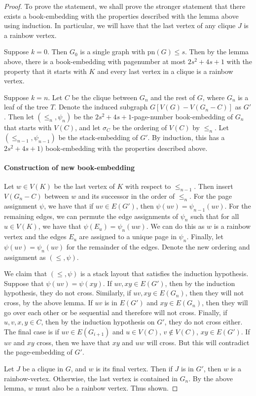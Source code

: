 \documentclass[]{report}
\newcommand{\pn}{\text{pn}}
\theoremstyle{definition}
\numberwithin{theorem}{section}
\numberwithin{equation}{section}
\begin{document}
\begin{proof}
	To prove the statement, we shall prove the stronger statement that there exists a book-embedding with the properties described with the lemma above using induction. In particular, we will have that the last vertex of any clique $J$ is a rainbow vertex.
	
	Suppose $k = 0$. Then $G_0$ is a single graph with $\pn(G) \leq s$. Then by the lemma above, there is a book-embedding with pagenumber at most $2s^2 + 4s + 1$ with the property that it starts with $K$ and every last vertex in a clique is a rainbow vertex.
	
	Suppose $k = n$. Let $C$ be the clique between $G_n$ and the rest of $G$, where $G_n$ is a leaf of the tree $T$. Denote the induced subgraph $G[V(G) - V(G_n - C)]$ as $G'$. Then let $(\leq_n, \psi_n)$ be the $2s^2 + 4s + 1$-page-number book-embedding of $G_n$ that starts with $V(C)$, and let $\sigma_C$ be the ordering of $V(C)$ by $\leq_n$. Let $(\leq_{n-1}, \psi_{n-1})$ be the stack-embedding of $G'$. By induction, this has a $2s^2 + 4s + 1)$ book-embedding with the properties described above.
	
	\paragraph{Construction  of new book-embedding}
	Let $w \in V(K)$ be the last vertex of $K$ with respect to $\leq_{n-1}$. Then insert $V(G_n - C)$ between $w$ and its successor in the order of $\leq_{n}$. For the page assignment $\psi$, we have that if $uv \in E(G')$, then $\psi(uv) = \psi_{n-1}(uv)$. For the remaining edges, we can permute the edge assignments of $\psi_n$ such that for all $u \in V(K)$, we have that $\psi(E_u) = \psi_n(uw)$. We can do this as $w$ is a rainbow vertex and the edges $E_u$ are assigned to a unique page in $\psi_n$. Finally, let $\psi(uv) = \psi_n(uv)$ for the remainder of the edges. Denote the new ordering and assignment as $(\leq, \psi)$. 
	
	We claim that $(\leq , \psi)$ is a stack layout that satisfies the induction hypothesis. Suppose that $\psi(uv) = \psi(xy)$. If $uv, xy \in E(G')$, then by the induction hypothesis, they do not cross. Similarly, if $uv, xy \in E(G_n)$, then they will not cross, by the above lemma. If $uv$ is in $E(G')$ and $xy \in E(G_n)$, then they will go over each other or be sequential and therefore will not cross. 
	Finally, if $u, v, x, y \in C$, then by the induction hypothesis on $G'$, they do not cross either. The final case is if $uv \in E(G_{i + 1})$ and $u \in V(C)$, $v \notin V(C)$, $xy \in E(G')$. If $uv$ and $xy$ cross, then we have that $xy$ and $uw$ will cross. But this will contradict the page-embedding of $G'$.
	
	Let $J$ be a clique in $G$, and $w$ is its final vertex. Then if $J$ is in $G'$, then $w$ is a rainbow-vertex. Otherwise, the last vertex is contained in $G_n$. By the above lemma, $w$ must also be a rainbow vertex. Thus shown.
\end{proof}
\end{document}
